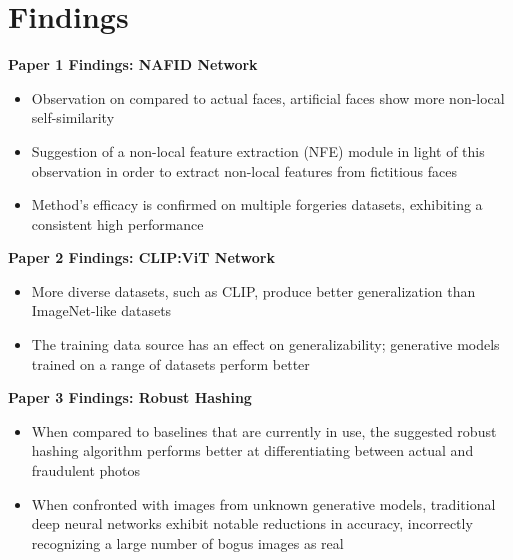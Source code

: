 \documentclass[a4paper,14pt]{report}
\begin{document}
\section{Findings}
\textbf{Paper 1 Findings: NAFID Network}
\begin{itemize}
    \item Observation on compared to actual faces, artificial faces show more non-local self-similarity
    \item Suggestion of a non-local feature extraction (NFE) module in light of this observation in order to extract non-local features from fictitious faces
    \item Method's efficacy is confirmed on multiple forgeries datasets, exhibiting a consistent high performance
\end{itemize}
\textbf{Paper 2 Findings: CLIP:ViT Network}
\begin{itemize}
    \item More diverse datasets, such as CLIP, produce better generalization than ImageNet-like datasets
    \item The training data source has an effect on generalizability; generative models trained on a range of datasets perform better
\end{itemize}
\textbf{Paper 3 Findings: Robust Hashing}
\begin{itemize}
    \item When compared to baselines that are currently in use, the suggested robust hashing algorithm performs better at differentiating between actual and fraudulent photos
    \item When confronted with images from unknown generative models, traditional deep neural networks exhibit notable reductions in accuracy, incorrectly recognizing a large number of bogus images as real
\end{itemize}
\vspace{0.5cm}
\end{document}

